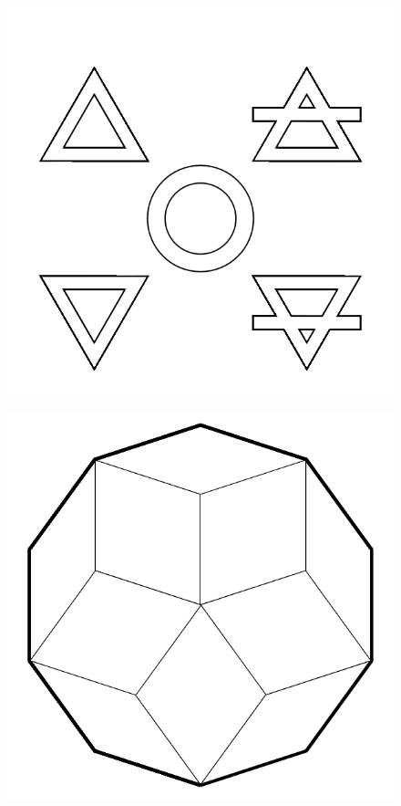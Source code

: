 \documentclass[17pt]{extreport}
\begin{document}
	\begin{figure}
		\centering
		\includegraphics[width=7.25in]{imageserver/uploadimages/image6.png}
	\end{figure}
	
	\begin{figure}
		\centering
		\includegraphics[width=7.25in]{imageserver/uploadimages/image7.png}
	\end{figure}
	
\end{document}
